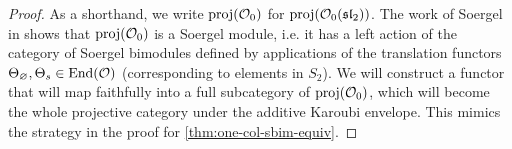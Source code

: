 \begin{proof}
    As a shorthand, we write $\operatorname{proj}(\mathcal{O}_0)$ for $\operatorname{proj}(\mathcal{O}_0(\operatorname{\mathfrak{sl}}_2))$. The work of Soergel in \cite[Section 2.4]{soergel-category-O} shows that $\operatorname{proj}(\mathcal{O}_0)$ is a Soergel module, i.e. it has a left action of the category of Soergel bimodules defined by applications of the translation functors $\Theta_\varnothing, \Theta_s \in \operatorname{End}(\mathcal{O})$ (corresponding to elements in $S_2$).  We will construct a functor that will map faithfully into a full subcategory of $\operatorname{proj}(\mathcal{O}_0)$, which will become the whole projective category under the additive Karoubi envelope. This mimics the strategy in the proof for \autoref{thm:one-col-sbim-equiv}.

    
    

\end{proof}
